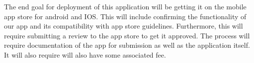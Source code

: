 

    The end goal for deployment of this application will be getting it on the mobile app store for android and IOS. This will include confirming the functionality of our app and its compatibility with app store guidelines. Furthermore, this will require submitting a review to the app store to get it approved. The process will require documentation of the app for submission as well as the application itself. It will also require will also have some associated fee. 





